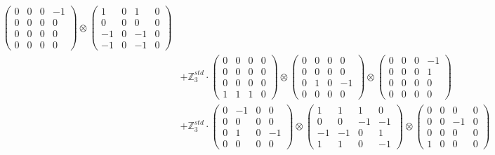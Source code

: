 \documentclass{article}
\begin{document}
{\begin{align}
            \begin{pmatrix} 0 & 0 & 0 & -1 \\ 0 & 0 & 0 & 0 \\ 0 & 0 & 0 & 0 \\ 0 & 0 & 0 & 0 \end{pmatrix} \otimes 
            \begin{pmatrix} 1 & 0 & 1 & 0 \\ 0 & 0 & 0 & 0 \\ -1 & 0 & -1 & 0 \\ -1 & 0 & -1 & 0 \end{pmatrix} \\ 
        &+ \label{Rs16-Rc11-Solution-16-c20} \mathbb{Z}_3^{std} \cdot 
            \begin{pmatrix} 0 & 0 & 0 & 0 \\ 0 & 0 & 0 & 0 \\ 0 & 0 & 0 & 0 \\ 1 & 1 & 1 & 0 \end{pmatrix} \otimes 
            \begin{pmatrix} 0 & 0 & 0 & 0 \\ 0 & 0 & 0 & 0 \\ 0 & 1 & 0 & -1 \\ 0 & 0 & 0 & 0 \end{pmatrix} \otimes 
            \begin{pmatrix} 0 & 0 & 0 & -1 \\ 0 & 0 & 0 & 1 \\ 0 & 0 & 0 & 0 \\ 0 & 0 & 0 & 0 \end{pmatrix} \\ 
        &+ \label{Rs16-Rc11-Solution-16-c21} \mathbb{Z}_3^{std} \cdot 
            \begin{pmatrix} 0 & -1 & 0 & 0 \\ 0 & 0 & 0 & 0 \\ 0 & 1 & 0 & -1 \\ 0 & 0 & 0 & 0 \end{pmatrix} \otimes 
            \begin{pmatrix} 1 & 1 & 1 & 0 \\ 0 & 0 & -1 & -1 \\ -1 & -1 & 0 & 1 \\ 1 & 1 & 0 & -1 \end{pmatrix} \otimes 
            \begin{pmatrix} 0 & 0 & 0 & 0 \\ 0 & 0 & -1 & 0 \\ 0 & 0 & 0 & 0 \\ 1 & 0 & 0 & 0 \end{pmatrix} \\ 

\end{align}}
\end{document}

